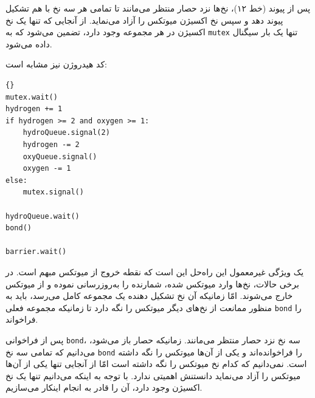\documentclass{book}
\begin{document}
    پس از پیوند (خط ۱۲)، نخ‌ها نزد حصار منتظر می‌مانند تا تمامی هر سه نخ با هم تشکیل پیوند دهد و سپس نخ اکسیژن میوتکس را آزاد می‌نماید. 
    از آنجایی که تنها یک نخ اکسیژن در هر مجموعه وجود دارد، تضمین می‌شود که به  {\tt mutex} تنها یک بار سیگنال داده می‌شود. 

    کد هیدروژن نیز مشابه است: 

\begin{latin}
\begin{lstlisting}[title=\rl{کد هیدروژن}]{}
mutex.wait()
hydrogen += 1
if hydrogen >= 2 and oxygen >= 1:
    hydroQueue.signal(2)
    hydrogen -= 2
    oxyQueue.signal()
    oxygen -= 1
else:
    mutex.signal()

hydroQueue.wait()
bond()

barrier.wait()
\end{lstlisting}
\end{latin}

    یک ویژگی غیرمعمول این راه‌حل این است که نقطه خروج از میوتکس مبهم است. در برخی حالات، نخ‌ها وارد میوتکس شده، شمارنده را 
    به‌روزرسانی نموده و از میوتکس خارج می‌شوند. امّا زمانیکه آن نخ تشکیل دهنده یک مجموعه کامل می‌رسد، باید به منظور ممانعت از نخ‌های دیگر 
    میوتکس را نگه دارد تا زمانیکه مجموعه فعلی {\tt bond} را فراخواند. 

    پس از فراخوانی {\tt bond}، سه نخ نزد حصار منتظر می‌مانند. زمانیکه حصار باز می‌شود، می‌دانیم که تمامی سه نخ {\tt bond} را فراخوانده‌اند و 
    یکی از آن‌ها میوتکس را نگه داشته است. نمی‌دانیم که  کدام نخ میوتکس را نگه داشته است امّا 
    از آنجایی تنها یکی از آن‌ها میوتکس را آزاد می‌نماید دانستنش اهمیتی ندارد. با توجه به اینکه می‌دانیم تنها یک نخ اکسیژن وجود دارد، آن را قادر به انجام اینکار 
    می‌سازیم. 
\end{document}
